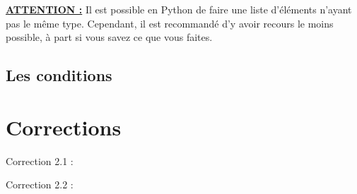 \documentclass[a4paper,12pt]{article}
\begin{document}
{\color{red}
\textbf{\underline{ATTENTION :}} Il est possible en Python de faire une liste d'éléments n'ayant pas le même type. Cependant, il est recommandé d'y avoir recours le moins possible, à part si vous savez ce que vous faites. 
}


\subsection{Les conditions}

\newpage

\section{Corrections}

\hypertarget{AncreExo2.1}{Correction 2.1 : }
\hypertarget{AncreExo2.2}{Correction 2.2 : }
\end{document}
